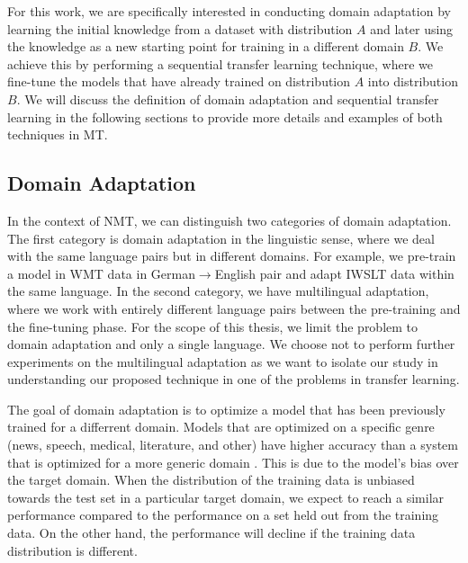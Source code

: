 For this work, we are specifically interested in conducting domain adaptation by learning the initial knowledge from a dataset with distribution $A$ and later using the knowledge as a new starting point for training in a different domain $B$. We achieve this by performing a sequential transfer learning technique, where we fine-tune the models that have already trained on distribution $A$ into distribution $B$. We will discuss the definition of domain adaptation and sequential transfer learning in the following sections to provide more details and examples of both techniques in MT.

\subsection{Domain Adaptation}
\label{sec:domain_adapt}
In the context of NMT, we can distinguish two categories of domain adaptation. The first category is domain adaptation in the linguistic sense, where we deal with the same language pairs but in different domains. For example, we pre-train a model in WMT data in German$\rightarrow$English pair and adapt IWSLT data within the same language. In the second category, we have multilingual adaptation, where we work with entirely different language pairs between the pre-training and the fine-tuning phase. For the scope of this thesis, we limit the problem to domain adaptation and only a single language. We choose not to perform further experiments on the multilingual adaptation as we want to isolate our study in understanding our proposed technique in one of the problems in transfer learning.

The goal of domain adaptation is to optimize a model that has been previously trained for a differrent domain. Models that are optimized on a specific genre (news, speech, medical, literature, and other) have higher accuracy than a system that is optimized for a more generic domain . This is due to the model's bias over the target domain. When the distribution of the training data is unbiased towards the test set in a particular target domain, we expect to reach a similar performance compared to the performance on a set held out from the training data. On the other hand, the performance will decline if the training data distribution is different.

